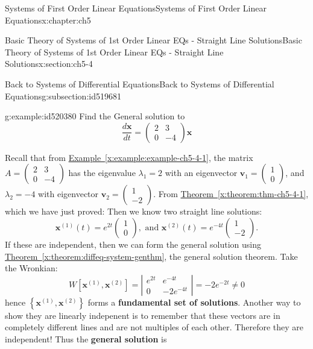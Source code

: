 \documentclass[oneside,10pt,]{book}
\newcommand{\xreffont}{\relax}
\newcommand{\terminology}[1]{\textbf{#1}}
\numberwithin{equation}{section}
\numberwithin{equation}{section}
\newcommand{\amp}{&}
\begin{document}
\begin{chapterptx}{Systems of First Order Linear Equations}{}{Systems of First Order Linear Equations}{}{}{x:chapter:ch5}
\begin{sectionptx}{Basic Theory of Systems of 1st Order Linear EQs - Straight Line Solutions}{}{Basic Theory of Systems of 1st Order Linear EQs - Straight Line Solutions}{}{}{x:section:ch5-4}
\begin{subsectionptx}{Back to Systems of Differential Equations}{}{Back to Systems of Differential Equations}{}{}{g:subsection:id519681}
\begin{example}{}{g:example:id520380}
Find the General solution to%
\begin{equation*}
\frac{d\mathbf{x}}{dt}=\left(\begin{array}{cc}
2 \amp 3\\
0 \amp -4
\end{array}\right)\mathbf{x}
\end{equation*}
%
\par
Recall that from \hyperref[x:example:example-ch5-4-1]{Example~{\xreffont\ref{x:example:example-ch5-4-1}}}, the matrix \(A=\left(\begin{array}{cc}
2 \amp 3\\
0 \amp -4
\end{array}\right)\) has the eigenvalue \(\lambda_{1}=2\) with an eigenvector \(\mathbf{v}_{1}=\left(\begin{array}{c}
1\\
0
\end{array}\right)\), and \(\lambda_{2}=-4\) with eigenvector \(\mathbf{v}_{2}=\left(\begin{array}{c}
1\\
-2
\end{array}\right)\). From \hyperref[x:theorem:thm-ch5-4-1]{Theorem~{\xreffont\ref{x:theorem:thm-ch5-4-1}}}, which we have just proved: Then we know two straight line solutions:%
\begin{equation*}
\mathbf{x}^{(1)}(t)=e^{2t}\left(\begin{array}{c}
1\\
0
\end{array}\right),\mbox{ and }\mathbf{x}^{(2)}(t)=e^{-4t}\left(\begin{array}{c}
1\\
-2
\end{array}\right).
\end{equation*}
If these are independent, then we can form the general solution using \hyperref[x:theorem:diffeq-system-genthm]{Theorem~{\xreffont\ref{x:theorem:diffeq-system-genthm}}}, the general solution theorem.  Take the Wronkian:%
\begin{equation*}
W\left[\mathbf{x}^{(1)},\mathbf{x}^{(2)}\right]=\left|\begin{array}{cc}
e^{2t} \amp e^{-4t}\\
0 \amp -2e^{-4t}
\end{array}\right|=-2e^{-2t}\neq0
\end{equation*}
hence \(\left\{ \mathbf{x}^{(1)},\mathbf{x}^{(2)}\right\} \) forms a \terminology{fundamental set of solutions}. Another way to show they are linearly indepenent is to remember that these vectors are in completely different lines and are not multiples of each other. Therefore they are independent! Thus the \terminology{general solution} is%

\end{example}
\end{subsectionptx}
\end{sectionptx}
\end{chapterptx}
\end{document}

